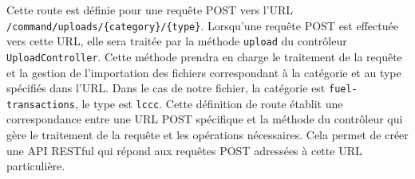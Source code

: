 Cette route est définie pour une requête POST vers l'URL \Verb|/command/uploads/{category}/{type}|. Lorsqu'une requête POST est effectuée vers cette URL, elle sera traitée par la méthode \Verb|upload| du contrôleur \Verb|UploadController|. Cette méthode prendra en charge le traitement de la requête et la gestion de l'importation des fichiers correspondant à la catégorie et au type spécifiés dans l'URL. Dans le cas de notre fichier, la catégorie est \Verb|fuel-transactions|, le type est \Verb|lccc|. Cette définition de route établit une correspondance entre une URL POST spécifique et la méthode du contrôleur qui gère le traitement de la requête et les opérations nécessaires. Cela permet de créer une API RESTful qui répond aux requêtes POST adressées à cette URL particulière.





